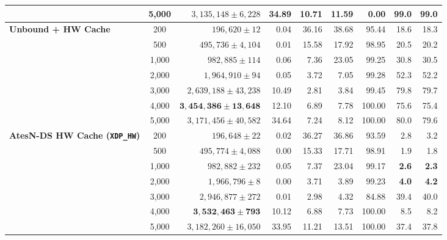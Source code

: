 \documentclass[a4paper,fleqn,colorlinks,hidelinks]{cas-sc}
\begin{document}
\begin{table}[t]
\begin{tabular}{@{}lcrrrrrrr@{}}
& 5,000 & $3{,}135{,}148 \pm 6{,}228$ & 34.89 & 10.71 & 11.59 & 0.00 & 99.0 & 99.0 \\
\midrule
\multirow{7}{*}{\textbf{Unbound + HW Cache}}
& 200 & $196{,}620 \pm 12$ & 0.04 & 36.16 & 38.68 & 95.44 & 18.6 & 18.3 \\
& 500 & $495{,}736 \pm 4{,}104$ & 0.01 & 15.58 & 17.92 & 98.95 & 20.5 & 20.2 \\
& 1,000 & $982{,}885 \pm 114$ & 0.06 & 7.36 & 23.05 & 99.25 & 30.8 & 30.5 \\
& 2,000 & $1{,}964{,}910 \pm 94$ & 0.05 & 3.72 & 7.05 & 99.28 & 52.3 & 52.2 \\
& 3,000 & $2{,}639{,}188 \pm 43{,}238$ & 10.49 & 2.81 & 3.84 & 99.45 & 79.8 & 79.7 \\
& 4,000 & $\mathbf{3{,}454{,}386 \pm 13{,}648}$ & 12.10 & 6.89 & 7.78 & 100.00 & 75.6 & 75.4 \\
& 5,000 & $3{,}171{,}456 \pm 40{,}582$ & 34.64 & 7.24 & 8.12 & 100.00 & 80.0 & 79.6 \\
\midrule
\multirow{7}{*}{\textbf{AtesN-DS HW Cache (\texttt{XDP\_HW})}}
& 200 & $196{,}648 \pm 22$ & 0.02 & 36.27 & 36.86 & 93.59 & 2.8 & 3.2 \\
& 500 & $495{,}774 \pm 4{,}088$ & 0.00 & 15.33 & 17.71 & 98.91 & 1.9 & 1.8 \\
& 1,000 & $982{,}882 \pm 232$ & 0.05 & 7.37 & 23.04 & 99.17 & \textbf{2.6} & \textbf{2.3} \\
& 2,000 & $1{,}966{,}796 \pm 8$ & 0.00 & 3.71 & 3.89 & 99.23 & \textbf{4.0} & \textbf{4.2} \\
& 3,000 & $2{,}946{,}877 \pm 272$ & 0.01 & 2.98 & 4.32 & 84.88 & 39.4 & 40.0 \\
& 4,000 & $\mathbf{3{,}532{,}463 \pm 793}$ & 10.12 & 6.88 & 7.73 & 100.00 & 8.5 & 8.2 \\
& 5,000 & $3{,}182{,}260 \pm 16{,}050$ & 33.95 & 11.21 & 13.51 & 100.00 & 37.4 & 37.8 \\
\bottomrule
\end{tabular}
\end{table}
\end{document}
